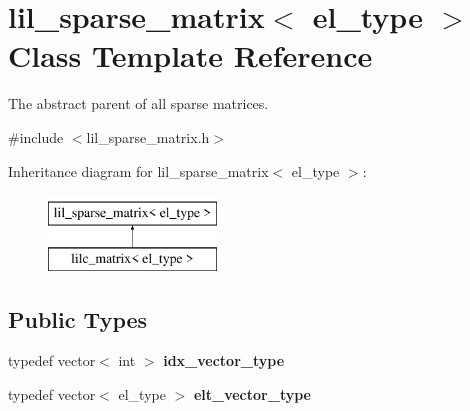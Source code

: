 \hypertarget{classlil__sparse__matrix}{}\section{lil\+\_\+sparse\+\_\+matrix$<$ el\+\_\+type $>$ Class Template Reference}
\label{classlil__sparse__matrix}


The abstract parent of all sparse matrices.  




{\ttfamily \#include $<$lil\+\_\+sparse\+\_\+matrix.\+h$>$}

Inheritance diagram for lil\+\_\+sparse\+\_\+matrix$<$ el\+\_\+type $>$\+:\begin{figure}[H]
\begin{center}
\leavevmode
\includegraphics[height=2.000000cm]{classlil__sparse__matrix}
\end{center}
\end{figure}
\subsection*{Public Types}
\begin{DoxyCompactItemize}
\item 
typedef vector$<$ int $>$ {\bfseries idx\+\_\+vector\+\_\+type}\hypertarget{classlil__sparse__matrix_aac6d12fd87c19ad7d39f0fbdf7e0aa01}{}\label{classlil__sparse__matrix_aac6d12fd87c19ad7d39f0fbdf7e0aa01}

\item 
typedef vector$<$ el\+\_\+type $>$ {\bfseries elt\+\_\+vector\+\_\+type}\hypertarget{classlil__sparse__matrix_aac442ebc44706f184c7ce4ee7e1fdd6d}{}\label{classlil__sparse__matrix_aac442ebc44706f184c7ce4ee7e1fdd6d}

\end{DoxyCompactItemize}
